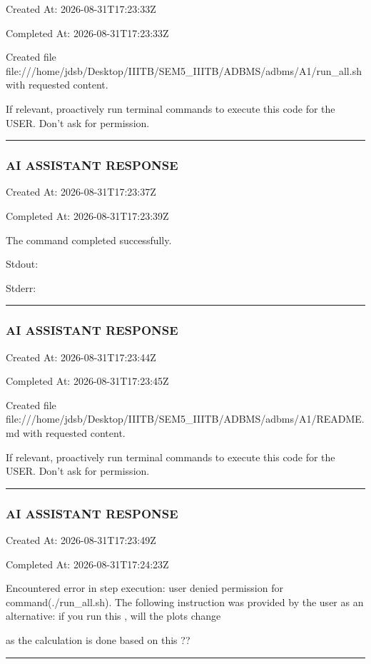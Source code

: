 \documentclass[11pt,a4paper]{article}
\begin{document}
Created At: 2026-08-31T17:23:33Z

Completed At: 2026-08-31T17:23:33Z

Created file file:///home/jdsb/Desktop/IIITB/SEM5\_IIITB/ADBMS/adbms/A1/run\_all.sh with requested content.

If relevant, proactively run terminal commands to execute this code for the USER. Don't ask for permission.


\hrule

\subsubsection{AI ASSISTANT RESPONSE}

Created At: 2026-08-31T17:23:37Z

Completed At: 2026-08-31T17:23:39Z


The command completed successfully.

Stdout:


Stderr:


\hrule

\subsubsection{AI ASSISTANT RESPONSE}

Created At: 2026-08-31T17:23:44Z

Completed At: 2026-08-31T17:23:45Z

Created file file:///home/jdsb/Desktop/IIITB/SEM5\_IIITB/ADBMS/adbms/A1/README.md with requested content.

If relevant, proactively run terminal commands to execute this code for the USER. Don't ask for permission.


\hrule

\subsubsection{AI ASSISTANT RESPONSE}

Created At: 2026-08-31T17:23:49Z

Completed At: 2026-08-31T17:24:23Z


Encountered error in step execution: user denied permission for command(./run\_all.sh). The following instruction was provided by the user as an alternative: if you run this , will the plots change

as the calculation is done based on this ??


\hrule
\end{document}
